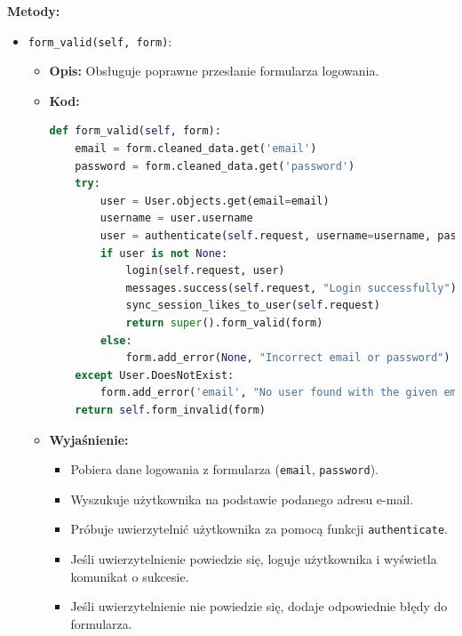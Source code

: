 \documentclass[12pt,a4paper,oneside]{article}
\theoremstyle{definition}
\numberwithin{equation}{section}
\begin{document}
\textbf{Metody:}
\begin{itemize}
    \item \texttt{form\_valid(self, form)}:
    \begin{itemize}
        \item \textbf{Opis:} Obsługuje poprawne przesłanie formularza logowania.
        \item \textbf{Kod:}
        \begin{lstlisting}[language=Python, caption=Metoda form\_valid w UserLoginView]
def form_valid(self, form):
    email = form.cleaned_data.get('email')
    password = form.cleaned_data.get('password')
    try:
        user = User.objects.get(email=email)
        username = user.username
        user = authenticate(self.request, username=username, password=password)
        if user is not None:
            login(self.request, user)
            messages.success(self.request, "Login successfully")
            sync_session_likes_to_user(self.request)
            return super().form_valid(form)
        else:
            form.add_error(None, "Incorrect email or password")
    except User.DoesNotExist:
        form.add_error('email', "No user found with the given email address")
    return self.form_invalid(form)
        \end{lstlisting}
        \item \textbf{Wyjaśnienie:}
        \begin{itemize}
            \item Pobiera dane logowania z formularza (\texttt{email}, \texttt{password}).
            \item Wyszukuje użytkownika na podstawie podanego adresu e-mail.
            \item Próbuje uwierzytelnić użytkownika za pomocą funkcji \texttt{authenticate}.
            \item Jeśli uwierzytelnienie powiedzie się, loguje użytkownika i wyświetla komunikat o sukcesie.
            \item Jeśli uwierzytelnienie nie powiedzie się, dodaje odpowiednie błędy do formularza.
        \end{itemize}
    \end{itemize}


\end{itemize}
\end{document}
